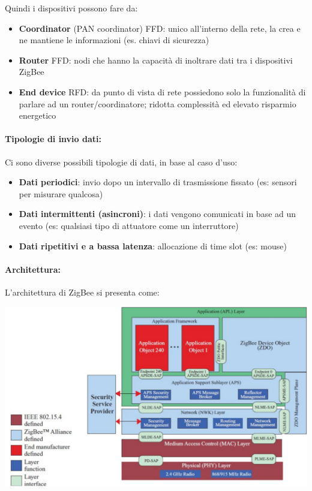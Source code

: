 Quindi i dispositivi possono fare da:
\begin{itemize}
	\item \textbf{Coordinator} (PAN coordinator) FFD: unico all'interno della rete, la crea e ne mantiene le informazioni (es. chiavi di sicurezza)
	\item \textbf{Router} FFD: nodi che hanno la capacità di inoltrare dati tra i dispositivi ZigBee
	\item \textbf{End device} RFD: da punto di vista di rete possiedono solo la funzionalità di parlare ad un router/coordinatore; ridotta complessità ed elevato risparmio energetico
\end{itemize}

\paragraph{Tipologie di invio dati:} Ci sono diverse possibili tipologie di dati, in base al caso d'uso: 
\begin{itemize}
	\item \textbf{Dati periodici}: invio dopo un intervallo di trasmissione fissato (es: sensori per misurare qualcosa)
	\item \textbf{Dati intermittenti (asincroni)}: i dati vengono comunicati in base ad un evento (es: qualsiasi tipo di attuatore come un interruttore)
	\item \textbf{Dati ripetitivi e a bassa latenza}: allocazione di time slot (es: mouse)
\end{itemize}

\paragraph{Architettura:} L'architettura di ZigBee si presenta come:
\begin{center}
	\includegraphics[width=0.98\linewidth]{img/wpan/zarch}
\end{center}

